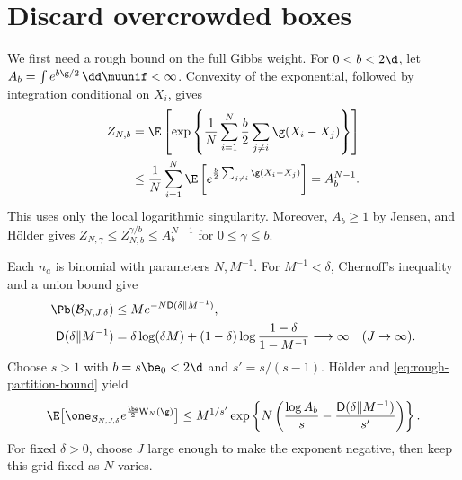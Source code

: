 \section{Discard overcrowded boxes}
\label{subsec:proof-bad-set}
We first need a rough bound on the full Gibbs weight.  For $0<b<2\d$, let
$A_b=\int e^{b\g/2}\,\dd\muunif<\infty$.
Convexity of the exponential, followed by integration conditional on $X_i$, gives
\begin{equation}
 \begin{aligned}
 Z_{N,b}
 &=\E\left[\exp\left\{\frac1N\sum_{i=1}^N
                   \frac b2\sum_{j\ne i}\g(X_i-X_j)\right\}\right]\\
 &\le\frac1N\sum_{i=1}^N
       \E\left[e^{\frac b2\sum_{j\ne i}\g(X_i-X_j)}\right]
 =A_b^{N-1}.
 \end{aligned}
 \label{eq:rough-partition-bound}
\end{equation}
This uses only the local logarithmic singularity.  Moreover, $A_b\ge1$ by Jensen, and H\"older gives $Z_{N,\gamma}\le Z_{N,b}^{\gamma/b}\le A_b^{N-1}$ for $0\le\gamma\le b$.

Each $n_a$ is binomial with parameters $N,M^{-1}$.  For $M^{-1}<\delta$, Chernoff's inequality and a union bound give
\begin{equation}
 \begin{aligned}
 \Pb(\mathcal B_{N,J,\delta})
 &\le M e^{-N\mathsf D(\delta\Vert M^{-1})},\\
 \mathsf D(\delta\Vert M^{-1})
 &=\delta\log(\delta M)
   +(1-\delta)\log\frac{1-\delta}{1-M^{-1}}
 \longrightarrow\infty\quad(J\to\infty).
 \end{aligned}
 \label{eq:physical-bad-probability}
\end{equation}
Choose $s>1$ with $b=s\be_0<2\d$ and $s'=s/(s-1)$.  H\"older and \eqref{eq:rough-partition-bound} yield
\begin{equation}
 \E\big[\one_{\mathcal B_{N,J,\delta}}e^{\frac\be2\mathsf W_N(\g)}\big]
 \le M^{1/s'}\exp\left\{N
 \left(\frac{\log A_b}{s}
       -\frac{\mathsf D(\delta\Vert M^{-1})}{s'}\right)\right\}.
 \label{eq:physical-bad-gibbs-bound}
\end{equation}
For fixed $\delta>0$, choose $J$ large enough to make the exponent negative, then keep this grid fixed as $N$ varies.
